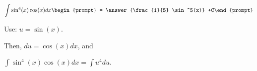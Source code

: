 \documentclass{ximera}
\author{Steven Gubkin\and Nela Lakos}
\begin{document}
\begin{exercise}

\[
\int \sin^4(x)\cos(x) dx \begin{prompt} = \answer{\frac{1}{5} \sin^5(x)} +C\end{prompt}
\]
\begin{hint}
Use: $u=\sin({x})$.
\end{hint}
\begin{hint}
Then, $du=\cos({x}) dx$, and 

$\int \sin^4(x)\cos(x) dx=\int u^4 du$.

\end{hint}
\end{exercise}
\end{document}
